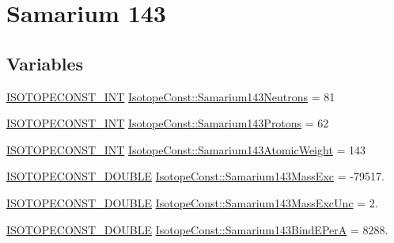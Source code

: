 \hypertarget{group___isotope_const-_samarium-_sm143}{}\section{Samarium 143}
\label{group___isotope_const-_samarium-_sm143}
\subsection*{Variables}
\begin{DoxyCompactItemize}
\item 
\mbox{\hyperlink{group___isotope_const-_macros_ga5f18360b3e99483a35c32d789e62621c}{I\+S\+O\+T\+O\+P\+E\+C\+O\+N\+S\+T\+\_\+\+I\+NT}} \mbox{\hyperlink{group___isotope_const-_samarium-_sm143_gadcab4c8c1f18f7720e39ce42b086eb75}{Isotope\+Const\+::\+Samarium143\+Neutrons}} = 81
\item 
\mbox{\hyperlink{group___isotope_const-_macros_ga5f18360b3e99483a35c32d789e62621c}{I\+S\+O\+T\+O\+P\+E\+C\+O\+N\+S\+T\+\_\+\+I\+NT}} \mbox{\hyperlink{group___isotope_const-_samarium-_sm143_gaea47b187802a084d0b7893bf939ffbc3}{Isotope\+Const\+::\+Samarium143\+Protons}} = 62
\item 
\mbox{\hyperlink{group___isotope_const-_macros_ga5f18360b3e99483a35c32d789e62621c}{I\+S\+O\+T\+O\+P\+E\+C\+O\+N\+S\+T\+\_\+\+I\+NT}} \mbox{\hyperlink{group___isotope_const-_samarium-_sm143_ga9c19acc89018e738e3d9ea1ed1a34a4b}{Isotope\+Const\+::\+Samarium143\+Atomic\+Weight}} = 143
\item 
\mbox{\hyperlink{group___isotope_const-_macros_ga8f45a7272ce02c0b4c65c44636ed719a}{I\+S\+O\+T\+O\+P\+E\+C\+O\+N\+S\+T\+\_\+\+D\+O\+U\+B\+LE}} \mbox{\hyperlink{group___isotope_const-_samarium-_sm143_ga2101ec148338c6a36bdca16701948265}{Isotope\+Const\+::\+Samarium143\+Mass\+Exc}} = -\/79517.
\item 
\mbox{\hyperlink{group___isotope_const-_macros_ga8f45a7272ce02c0b4c65c44636ed719a}{I\+S\+O\+T\+O\+P\+E\+C\+O\+N\+S\+T\+\_\+\+D\+O\+U\+B\+LE}} \mbox{\hyperlink{group___isotope_const-_samarium-_sm143_ga6286419ba542101a09767c69a7c71af0}{Isotope\+Const\+::\+Samarium143\+Mass\+Exc\+Unc}} = 2.
\item 
\mbox{\hyperlink{group___isotope_const-_macros_ga8f45a7272ce02c0b4c65c44636ed719a}{I\+S\+O\+T\+O\+P\+E\+C\+O\+N\+S\+T\+\_\+\+D\+O\+U\+B\+LE}} \mbox{\hyperlink{group___isotope_const-_samarium-_sm143_ga0d35dfa458c94e8a3b63bf005bacadb2}{Isotope\+Const\+::\+Samarium143\+Bind\+E\+PerA}} = 8288.
\item 

\end{DoxyCompactItemize}
